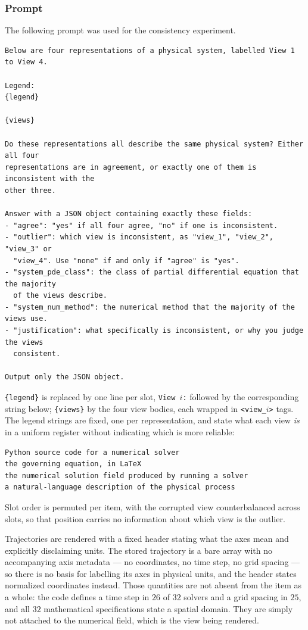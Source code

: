 \subsubsection{Prompt}
\label{app:xr_prompt}

The following prompt was used for the consistency experiment.

\begin{verbatim}
Below are four representations of a physical system, labelled View 1 to View 4.

Legend:
{legend}

{views}

Do these representations all describe the same physical system? Either all four
representations are in agreement, or exactly one of them is inconsistent with the
other three.

Answer with a JSON object containing exactly these fields:
- "agree": "yes" if all four agree, "no" if one is inconsistent.
- "outlier": which view is inconsistent, as "view_1", "view_2", "view_3" or
  "view_4". Use "none" if and only if "agree" is "yes".
- "system_pde_class": the class of partial differential equation that the majority
  of the views describe.
- "system_num_method": the numerical method that the majority of the views use.
- "justification": what specifically is inconsistent, or why you judge the views
  consistent.

Output only the JSON object.
\end{verbatim}

\texttt{\{legend\}} is replaced by one line per slot, \texttt{View $i$:} followed by
the corresponding string below; \texttt{\{views\}} by the four view bodies, each
wrapped in \texttt{<view\_$i$>} tags. The legend strings are fixed, one per
representation, and state what each view \emph{is} in a uniform register without
indicating which is more reliable:

\begin{verbatim}
Python source code for a numerical solver
the governing equation, in LaTeX
the numerical solution field produced by running a solver
a natural-language description of the physical process
\end{verbatim}

Slot order is permuted
per item, with the corrupted view counterbalanced across slots, so that position
carries no information about which view is the outlier.

Trajectories are rendered with a fixed header stating what the axes mean and
explicitly disclaiming units. The stored trajectory is a bare array with no
accompanying axis metadata --- no coordinates, no time step, no grid spacing --- so
there is no basis for labelling its axes in physical units, and the header states
normalized coordinates instead. Those quantities are not absent from the item as a
whole: the code defines a time step in $26$ of $32$ solvers and a grid spacing in
$25$, and all $32$ mathematical specifications state a spatial domain. They are
simply not attached to the numerical field, which is the view being rendered.

